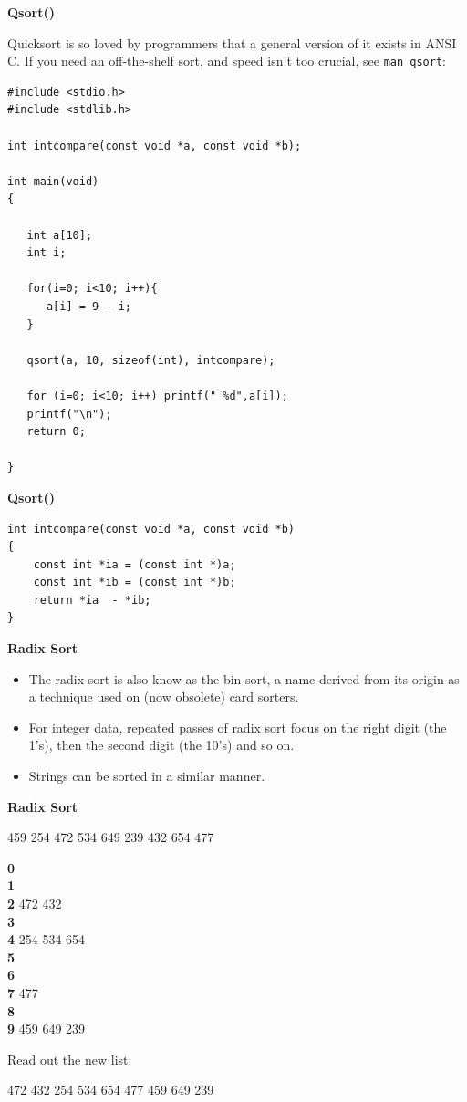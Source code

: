 \documentclass[a4,portraitt]{slides}
\begin{document}
\newpage
{\samepage
\begin{center}
{\Large{\bf Qsort()}}
\end{center}
Quicksort is so loved by programmers that a general version of
it exists in ANSI C. If you need an off-the-shelf sort, and speed isn't
too crucial, see \verb^man qsort^:
\begin{verbatim}
#include <stdio.h>
#include <stdlib.h>

int intcompare(const void *a, const void *b);

int main(void)
{

   int a[10];
   int i;

   for(i=0; i<10; i++){
      a[i] = 9 - i;
   }

   qsort(a, 10, sizeof(int), intcompare);

   for (i=0; i<10; i++) printf(" %d",a[i]);
   printf("\n");
   return 0;

}
\end{verbatim}
}

\newpage
{\samepage
\begin{center}
{\Large{\bf Qsort()}}
\end{center}
\begin{verbatim}
int intcompare(const void *a, const void *b)
{
    const int *ia = (const int *)a;
    const int *ib = (const int *)b;
    return *ia  - *ib;
}
\end{verbatim}
}

\newpage
{\samepage
\begin{center}
{\Large{\bf Radix Sort}}
\end{center}
\begin{itemize}
\item The radix sort is also know as the bin sort, a name
derived from its origin as a technique used on (now obsolete)
card sorters.
\item For integer data, repeated passes of radix sort focus
on the right digit (the 1's), then the second digit (the 10's)
and so on.
\item Strings can be sorted in a similar manner.
\end{itemize}
}

\newpage
{\samepage
\begin{center}
{\Large{\bf Radix Sort}}
\end{center}

459 254 472 534 649 239 432 654 477

{\bf 0}\\
{\bf 1}\\
{\bf 2} 472 432\\
{\bf 3}\\
{\bf 4} 254 534 654\\
{\bf 5}\\
{\bf 6}\\
{\bf 7} 477\\
{\bf 8}\\
{\bf 9} 459 649 239

Read out the new list:

472 432 254 534 654 477 459 649 239
}
\end{document}
